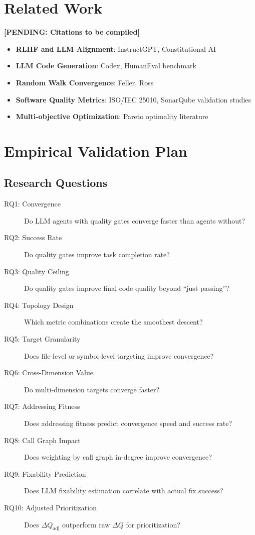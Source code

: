 \documentclass[11pt,a4paper]{article}
\begin{document}
\section{Related Work}
\label{sec:related}

\textbf{[PENDING: Citations to be compiled]}

\begin{itemize}
  \item \textbf{RLHF and LLM Alignment}: InstructGPT, Constitutional AI
  \item \textbf{LLM Code Generation}: Codex, HumanEval benchmark
  \item \textbf{Random Walk Convergence}: Feller, Ross
  \item \textbf{Software Quality Metrics}: ISO/IEC 25010, SonarQube validation studies
  \item \textbf{Multi-objective Optimization}: Pareto optimality literature
\end{itemize}

\section{Empirical Validation Plan}
\label{sec:validation}

\subsection{Research Questions}

\begin{description}
  \item[RQ1: Convergence] Do LLM agents with quality gates converge faster than agents without?
  \item[RQ2: Success Rate] Do quality gates improve task completion rate?
  \item[RQ3: Quality Ceiling] Do quality gates improve final code quality beyond ``just passing''?
  \item[RQ4: Topology Design] Which metric combinations create the smoothest descent?
  \item[RQ5: Target Granularity] Does file-level or symbol-level targeting improve convergence?
  \item[RQ6: Cross-Dimension Value] Do multi-dimension targets converge faster?
  \item[RQ7: Addressing Fitness] Does addressing fitness predict convergence speed and success rate?
  \item[RQ8: Call Graph Impact] Does weighting by call graph in-degree improve convergence?
  \item[RQ9: Fixability Prediction] Does LLM fixability estimation correlate with actual fix success?
  \item[RQ10: Adjusted Prioritization] Does $\Delta Q_{\text{adj}}$ outperform raw $\Delta Q$ for prioritization?
\end{description}
\end{document}

